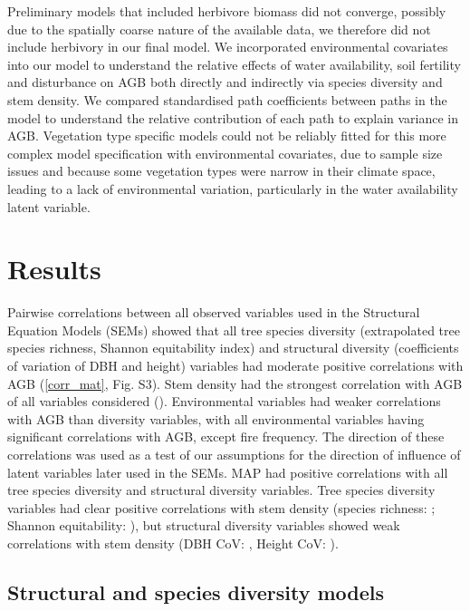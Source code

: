 \documentclass[11pt,a4paper]{article}
\begin{document}
Preliminary models that included herbivore biomass \citep{Hempson2017} did not converge, possibly due to the spatially coarse nature of the available data, we therefore did not include herbivory in our final model. We incorporated environmental covariates into our model to understand the relative effects of water availability, soil fertility and disturbance on AGB both directly and indirectly via species diversity and stem density. We compared standardised path coefficients between paths in the model to understand the relative contribution of each path to explain variance in AGB. Vegetation type specific models could not be reliably fitted for this more complex model specification with environmental covariates, due to sample size issues and because some vegetation types were narrow in their climate space, leading to a lack of environmental variation, particularly in the water availability latent variable.

\section{Results}

Pairwise correlations between all observed variables used in the Structural Equation Models (SEMs) showed that all tree species diversity (extrapolated tree species richness, Shannon equitability index) and structural diversity (coefficients of variation of DBH and height) variables had moderate positive correlations with AGB (\autoref{corr_mat}, Fig. S3). Stem density had the strongest correlation with AGB of all variables considered (\ccib{}). Environmental variables had weaker correlations with AGB than diversity variables, with all environmental variables having significant correlations with AGB, except fire frequency. The direction of these correlations was used as a test of our assumptions for the direction of influence of latent variables later used in the SEMs. MAP had positive correlations with all tree species diversity and structural diversity variables. Tree species diversity variables had clear positive correlations with stem density (species richness: \ccsi{}; Shannon equitability: \ccei{}), but structural diversity variables showed weak correlations with stem density (DBH CoV: \ccdvi{}, Height CoV: \cchvi{}).

\subsection{Structural and species diversity models}
\end{document}

